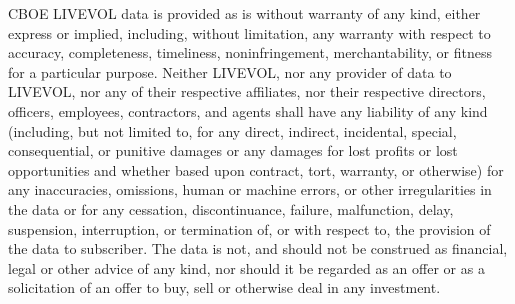 \documentclass[graybox,envcountchap,sectrefs]{svmono}\usepackage[]{graphicx}\usepackage[]{xcolor}
\begin{document}
CBOE LIVEVOL data is provided \textquotedbl as is\textquotedbl{}
without warranty of any kind, either express or implied, including,
without limitation, any warranty with respect to accuracy, completeness,
timeliness, noninfringement, merchantability, or fitness for a particular
purpose. Neither LIVEVOL, nor any provider of data to LIVEVOL, nor
any of their respective affiliates, nor their respective directors,
officers, employees, contractors, and agents shall have any liability
of any kind (including, but not limited to, for any direct, indirect,
incidental, special, consequential, or punitive damages or any damages
for lost profits or lost opportunities and whether based upon contract,
tort, warranty, or otherwise) for any inaccuracies, omissions, human
or machine errors, or other irregularities in the data or for any
cessation, discontinuance, failure, malfunction, delay, suspension,
interruption, or termination of, or with respect to, the provision
of the data to subscriber. The data is not, and should not be construed
as financial, legal or other advice of any kind, nor should it be
regarded as an offer or as a solicitation of an offer to buy, sell
or otherwise deal in any investment.

\printbibliography
\end{document}
